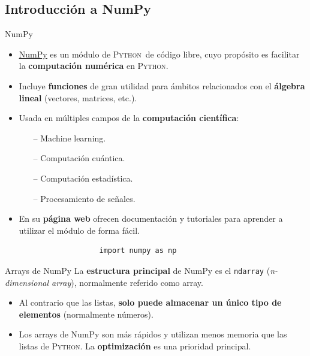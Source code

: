 \documentclass[10pt]{beamer} %
\newcommand{\py}{\textsc{Python}}
\begin{document}
\subsection{Introducción a NumPy}
\begin{frame}[fragile]{NumPy}
    \begin{itemize}
        \item \href{https://numpy.org/}{\underline{NumPy}} es un módulo de \py\, de código libre, cuyo propósito es facilitar la \textbf{computación numérica} en \py.
        \item Incluye \textbf{funciones} de gran utilidad para ámbitos relacionados con el \textbf{álgebra lineal} (vectores, matrices, etc.).
        \item Usada en múltiples campos de la \textbf{computación científica}:
        \begin{itemize}
            \item[--] Machine learning.
            \item[--] Computación cuántica.
            \item[--] Computación estadística.
            \item[--] Procesamiento de señales.
        \end{itemize}
        \item En su \textbf{página web} ofrecen documentación y tutoriales para aprender a utilizar el módulo de forma fácil.
    \end{itemize}
    \vspace{10pt}
    \begin{verbatim}
                      import numpy as np
    \end{verbatim}
\end{frame}

\begin{frame}{Arrays de NumPy}
    La \textbf{estructura principal} de NumPy es el \texttt{ndarray} (\textit{n-dimensional array}), normalmente referido como array.
    \begin{itemize}
        \item Al contrario que las listas, \textbf{solo puede almacenar un único tipo de elementos} (normalmente números).
        \item Los arrays de NumPy son más rápidos y utilizan menos memoria que las listas de \py. La \textbf{optimización} es una prioridad principal.
    \end{itemize}
\end{frame}
\end{document}
